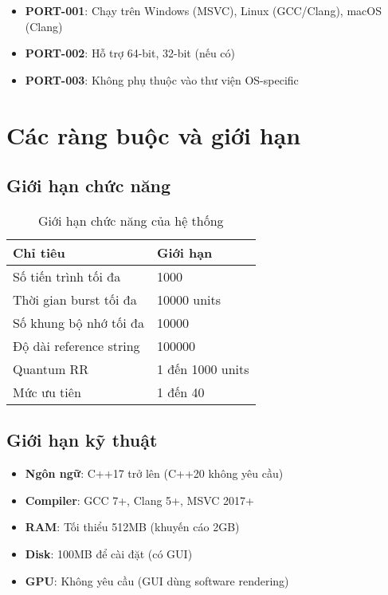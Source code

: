 \begin{itemize}[leftmargin=1.5cm]
  \item \textbf{PORT-001}: Chạy trên Windows (MSVC), Linux (GCC/Clang), macOS (Clang)
  \item \textbf{PORT-002}: Hỗ trợ 64-bit, 32-bit (nếu có)
  \item \textbf{PORT-003}: Không phụ thuộc vào thư viện OS-specific
\end{itemize}

\section{Các ràng buộc và giới hạn}

\subsection{Giới hạn chức năng}

\begin{table}[H]
\centering
\caption{Giới hạn chức năng của hệ thống}
\begin{tabular}{ll}
\toprule
\textbf{Chỉ tiêu} & \textbf{Giới hạn} \\
\midrule
Số tiến trình tối đa & 1000 \\
Thời gian burst tối đa & 10000 units \\
Số khung bộ nhớ tối đa & 10000 \\
Độ dài reference string & 100000 \\
Quantum RR & 1 đến 1000 units \\
Mức ưu tiên & 1 đến 40 \\
\bottomrule
\end{tabular}
\end{table}

\subsection{Giới hạn kỹ thuật}

\begin{itemize}[leftmargin=1.5cm]
  \item \textbf{Ngôn ngữ}: C++17 trở lên (C++20 không yêu cầu)
  \item \textbf{Compiler}: GCC 7+, Clang 5+, MSVC 2017+
  \item \textbf{RAM}: Tối thiểu 512MB (khuyến cáo 2GB)
  \item \textbf{Disk}: 100MB để cài đặt (có GUI)
  \item \textbf{GPU}: Không yêu cầu (GUI dùng software rendering)
\end{itemize}

